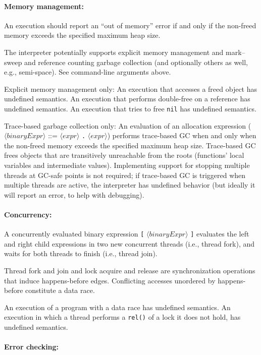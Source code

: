 \documentclass[10pt]{article}
\newcommand{\nt}[1]{\ensuremath{\langle \mathit{#1} \rangle}}
\newcommand{\tm}[1]{\texttt{#1}}
\begin{document}
\paragraph{Memory management:}

An execution should report an ``out of memory'' error if and only if the non-freed memory exceeds the specified maximum heap size.

The interpreter potentially supports explicit memory management
and mark--sweep and reference counting garbage collection
(and optionally others as well, e.g., semi-space). See command-line arguments above.

Explicit memory management only:
An execution that accesses a freed object has undefined semantics.
An execution that performs double-free on a reference has undefined semantics.
An execution that tries to free \tm{nil} has undefined semantics.

Trace-based garbage collection only:
An evaluation of an allocation expression
(\nt{binaryExpr} ::= \nt{expr} \tm{.} \nt{expr})
performs trace-based GC when and only when the non-freed memory exceeds the specified maximum heap size.
Trace-based GC frees objects that are transitively unreachable from the roots (functions' local variables and intermediate values).
Implementing support for stopping multiple threads at GC-safe points is not required;
if trace-based GC is triggered when multiple threads are active,
the interpreter has undefined behavior (but ideally it will report an error, to help with debugging).

\paragraph{Concurrency:}

A concurrently evaluated binary expression
\tm{[} \nt{binaryExpr} \tm{]}
evaluates the left and right child expressions in two new concurrent threads (i.e., thread fork),
and waits for both threads to finish (i.e., thread join).

Thread fork and join and lock acquire and release are synchronization operations that induce happens-before edges.
Conflicting accesses unordered by happens-before constitute a data race.

An execution of a program with a data race has undefined semantics.
An execution in which a thread performs a \tm{rel()} of a lock it does not hold, has undefined semantics.

\paragraph{Error checking:}
\end{document}
